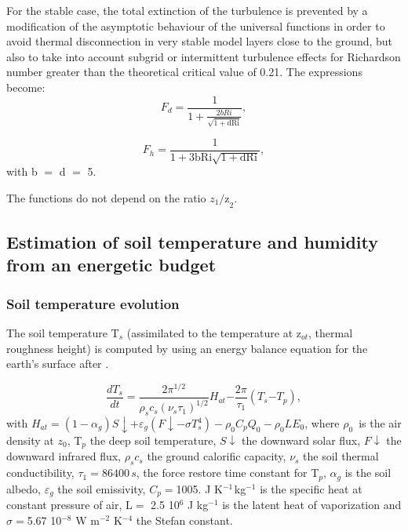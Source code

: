 For the stable case, the total extinction of the turbulence is prevented by
a modification of the asymptotic behaviour of the universal functions in
order to avoid thermal disconnection in very stable model layers close to
the ground, but also to take into account subgrid or intermittent turbulence
effects for Richardson number greater than the theoretical critical value of
0.21. The expressions become:
\begin{equation}
\label{eq20}
F_{d} =\frac{1}{1+\frac{2bRi}{\sqrt
{1+\mbox{dRi}} }},
\end{equation}

\begin{equation}
\label{eq21}
F_{h} =\frac{1}{1+\mbox{3bRi}\sqrt
{1+\mbox{dRi}} },
\end{equation}
with b $=$ d $=$ 5.

The functions do not depend on the ratio $z_{1}
\mbox{/z}_{2} $.

\subsection{Estimation of soil temperature and humidity from an energetic budget}

\subsubsection{Soil temperature evolution}
The soil temperature T$_{s}$ (assimilated to the temperature at z$_{ot}$,
thermal roughness height) is computed by using an energy balance equation
for the earth's surface after \cite{Deardorff:1978}.

\begin{equation}
\label{eq22}
\frac{dT_{s}}{dt}\mathrm{=}\frac{\mathrm{2}\pi^{\mathrm{1/2}}}{\rho
_{s}c_{s}\left( \nu_{s}\tau_{\mathrm{1}}
\right)^{\mathrm{1/2}}}H_{at}\mathrm{-}\frac{\mathrm{2}\pi }{\tau
_{\mathrm{1}}}\left( T_{s}\mathrm{-}T_{p} \right),
\end{equation}
\newline
with $H_{at}=\left( 1-\alpha_{g} \right)S\downarrow +\varepsilon
_{g}(F\downarrow -\sigma T_{s}^{4})-\rho_{0}C_{p}Q_{0}-\rho_{0}LE_{0}$,
\newline
where $\rho_{0}\, $ is the air density at $z_{0}$, T$_{p}$ the deep soil temperature,
\newline
$S\downarrow $ the downward solar flux, $F\downarrow $ the downward infrared flux,
\newline
$\rho_{s}c_{s}$ the ground calorific capacity, $\nu_{s}$ the soil thermal conductibility,
\newline
$\tau_{\mathrm{1}}=86400\, s$, the force restore time constant for T$_{p}$,
\newline
$\alpha_{g}$ is the soil albedo, $\varepsilon_{g}$ the soil emissivity,
\newline
$C_{p}=$1005. J K$^{-1\, }$kg$^{-1}$ is the specific heat at constant pressure of air,
\newline
L$=$ 2.5 10$^{6}$ J kg$^{-1}$ is the latent heat of vaporization and
\newline
$\sigma =$5.67 10$^{-8}$ W m$^{-2}$ K$^{-4}$ the Stefan constant.

